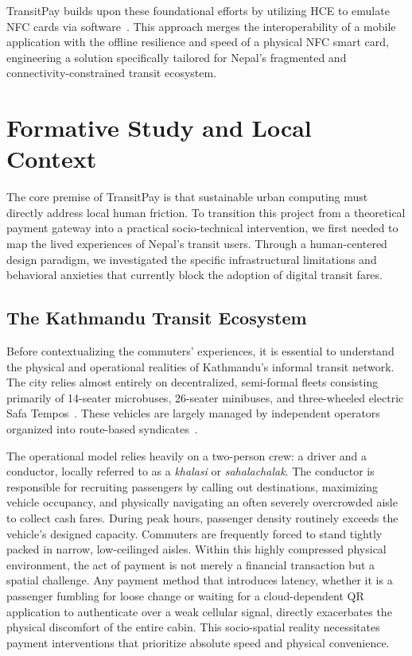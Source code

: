\documentclass[manuscript,review,anonymous]{acmart}
\begin{document}
TransitPay builds upon these foundational efforts by utilizing HCE to emulate NFC cards via software~\cite{alattar2014host, alliance2014host}. This approach merges the interoperability of a mobile application with the offline resilience and speed of a physical NFC smart card, engineering a solution specifically tailored for Nepal's fragmented and connectivity-constrained transit ecosystem.

\section{Formative Study and Local Context}
\label{sec:formative_study}
The core premise of TransitPay is that sustainable urban computing must directly address local human friction. To transition this project from a theoretical payment gateway into a practical socio-technical intervention, we first needed to map the lived experiences of Nepal's transit users. Through a human-centered design paradigm, we investigated the specific infrastructural limitations and behavioral anxieties that currently block the adoption of digital transit fares.

\subsection{The Kathmandu Transit Ecosystem}
Before contextualizing the commuters' experiences, it is essential to understand the physical and operational realities of Kathmandu's informal transit network. The city relies almost entirely on decentralized, semi-formal fleets consisting primarily of 14-seater microbuses, 26-seater minibuses, and three-wheeled electric Safa Tempos~\cite{jica2017kathmandu_transport}. These vehicles are largely managed by independent operators organized into route-based syndicates~\cite{worldbank2013kathmandu}.

The operational model relies heavily on a two-person crew: a driver and a conductor, locally referred to as a \textit{khalasi} or \textit{sahalachalak}. The conductor is responsible for recruiting passengers by calling out destinations, maximizing vehicle occupancy, and physically navigating an often severely overcrowded aisle to collect cash fares. During peak hours, passenger density routinely exceeds the vehicle's designed capacity. Commuters are frequently forced to stand tightly packed in narrow, low-ceilinged aisles. Within this highly compressed physical environment, the act of payment is not merely a financial transaction but a spatial challenge. Any payment method that introduces latency, whether it is a passenger fumbling for loose change or waiting for a cloud-dependent QR application to authenticate over a weak cellular signal, directly exacerbates the physical discomfort of the entire cabin. This socio-spatial reality necessitates payment interventions that prioritize absolute speed and physical convenience.
\end{document}
